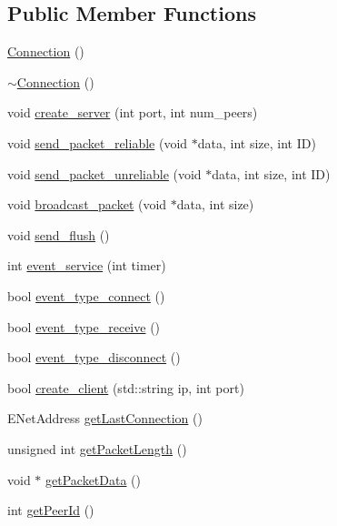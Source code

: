 \subsection*{Public Member Functions}
\begin{DoxyCompactItemize}
\item 
\hyperlink{class_connection_a9de94289ca6259f94ef6aeba3b134a77}{Connection} ()
\item 
\hyperlink{class_connection_a2e4352edf667bea83001569e9da8a24d}{$\sim$\+Connection} ()
\item 
void \hyperlink{class_connection_acdb1c6f1844698b2688cb611f7029d7c}{create\+\_\+server} (int port, int num\+\_\+peers)
\item 
void \hyperlink{class_connection_a3dda26c4c789d0f5e54fb50cae606022}{send\+\_\+packet\+\_\+reliable} (void $\ast$data, int size, int I\+D)
\item 
void \hyperlink{class_connection_a194e26770302ecac113375475df57e42}{send\+\_\+packet\+\_\+unreliable} (void $\ast$data, int size, int I\+D)
\item 
void \hyperlink{class_connection_a2d554f43b1e9d4a71acdd1ba297fc11b}{broadcast\+\_\+packet} (void $\ast$data, int size)
\item 
void \hyperlink{class_connection_ace9a66bd4a77270df4587df1405d4033}{send\+\_\+flush} ()
\item 
int \hyperlink{class_connection_a67a66948fd3b286a0a4faaaedb69e56e}{event\+\_\+service} (int timer)
\item 
bool \hyperlink{class_connection_a75f10c526b51675497a81e1f2c26ba9e}{event\+\_\+type\+\_\+connect} ()
\item 
bool \hyperlink{class_connection_ab0db0e5c8463aca4ec668107b1a46349}{event\+\_\+type\+\_\+receive} ()
\item 
bool \hyperlink{class_connection_a58f2ca9fedd8369ebdf61725f31123ef}{event\+\_\+type\+\_\+disconnect} ()
\item 
bool \hyperlink{class_connection_a8e9748ced0d65d12e5781ef21b1e7928}{create\+\_\+client} (std\+::string ip, int port)
\item 
E\+Net\+Address \hyperlink{class_connection_a4eec19a6b526fafaf4fa87a433a0a2d4}{get\+Last\+Connection} ()
\item 
unsigned int \hyperlink{class_connection_ab1a9ae7a0dea88ea63ea4a2d1cbec4d9}{get\+Packet\+Length} ()
\item 
void $\ast$ \hyperlink{class_connection_a2431e1403029cf660aa897eba8ec978a}{get\+Packet\+Data} ()
\item 
int \hyperlink{class_connection_a6a9cbc7d881550fcc0e768e3ee7bf171}{get\+Peer\+Id} ()
\end{DoxyCompactItemize}


